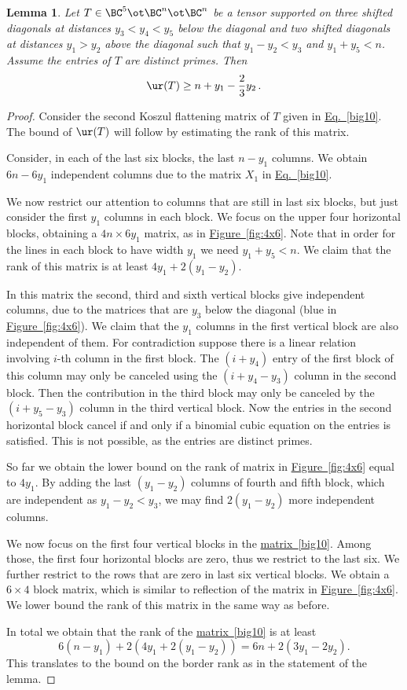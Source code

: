 \documentclass[11pt]{article}
\newcommand{\expref}[2]{\texorpdfstring{\hyperref[#2]{#1~\ref{#2}}}{#1~\ref{#2}}}
\newcommand{\expeqref}[2]{\texorpdfstring{\hyperref[#2]{#1~\eqref{#2}}}{#1~\eqref{#2}}}
\newtheorem{lemma}[theorem]{Lemma}
\begin{document}
\begin{lemma}\label{primecase}
Let $T\in \BC^5\ot \BC^{n}\ot \BC^{n}$ be a tensor supported on 
three 
%
shifted 
diagonals at distances $y_3<y_4<y_5$ below the diagonal and two 
%
shifted 
diagonals
at distances $y_1>y_2$ above the diagonal such that $y_1-y_2<y_3$ and $y_1+y_5<n$.
Assume the entries of $T$ are distinct primes.
Then
$$
\ur(T)\geq n+y_1-\frac 23 y_2\,.
$$
\end{lemma}
\begin{proof}
Consider the second Koszul flattening matrix of $T$ given in \expeqref{Eq.}{big10}. The bound of $\ur(T)$ will follow by estimating the rank of this matrix.
 
Consider,  in each of the last six blocks,
the last $n-y_1$ columns. We obtain $6n-6y_1$ independent columns  due to the matrix $X_1$ in
\expeqref{Eq.}{big10}. 

We now restrict our attention to columns that are still in last six blocks, but
just consider the  first $y_1$ columns in each block. We focus on the upper four horizontal blocks, obtaining a $4n\times 6y_1$ matrix, as in \expref{Figure}{fig:4x6}. Note that in order for the lines in each block to have width $y_1$ we need  $y_1+y_5<n$. 
We claim that the rank of this matrix is at least $4y_1+2(y_1-y_2)$.

In this matrix the second, third and sixth vertical blocks give independent columns, due to the matrices that are $y_3$ below the diagonal (blue in \expref{Figure}{fig:4x6}). We claim that the $y_1$ columns in the first vertical block are also independent of  them. For contradiction suppose there is a linear relation involving $i$-th column in the first block. The $(i+y_4)$ entry of the first block of this column may only be canceled using the $(i+y_4-y_3)$ column in the second block. Then the contribution in the third block may only be canceled by the $(i+y_5-y_3)$ column in the third vertical block. Now the entries in the second horizontal block cancel if and only if a binomial cubic equation on the entries is satisfied. This is not possible, as the entries are distinct primes. 

So far we obtain the lower bound on the rank of matrix in \expref{Figure}{fig:4x6} equal to $4y_1$. By adding
the  last $(y_1-y_2)$ columns of fourth and fifth block, which are independent as $y_1-y_2<y_3$, we may find $2(y_1-y_2)$ more independent columns. 


We now focus on the first four vertical blocks in
the \expeqref{matrix}{big10}.  %
Among those,
the first four horizontal blocks are zero, thus we restrict to the last six. We further restrict to the rows that are zero in last six vertical blocks. We obtain a $6\times 4$ block matrix, which is similar to reflection of the matrix in \expref{Figure}{fig:4x6}. We lower bound  the rank of this matrix in 
the same way as before.

In total we obtain that the rank of
the \expeqref{matrix}{big10} is at least  %
$$6(n-y_1)+2(4y_1+2(y_1-y_2))=6n+2(3y_1-2y_2).$$
This   translates to the bound on the border rank as in the statement of the lemma.
\end{proof}
\end{document}

